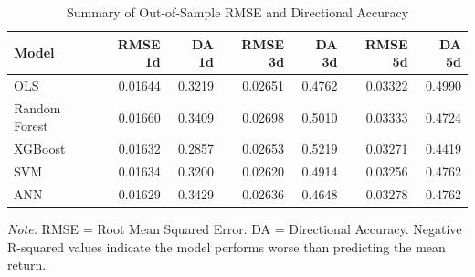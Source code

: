 \begin{table}[!ht]
\centering
\begin{threeparttable}
\caption{Summary of Out-of-Sample RMSE and Directional Accuracy}
\label{tab:main_results}

\begin{tabular}{lrrrrrr}
\toprule
Model & RMSE 1d & DA 1d & RMSE 3d & DA 3d & RMSE 5d & DA 5d\\
\midrule
OLS & 0.01644 & 0.3219 & 0.02651 & 0.4762 & 0.03322 & 0.4990\\
Random Forest & 0.01660 & 0.3409 & 0.02698 & 0.5010 & 0.03333 & 0.4724\\
XGBoost & 0.01632 & 0.2857 & 0.02653 & 0.5219 & 0.03271 & 0.4419\\
SVM & 0.01634 & 0.3200 & 0.02620 & 0.4914 & 0.03256 & 0.4762\\
ANN & 0.01629 & 0.3429 & 0.02636 & 0.4648 & 0.03278 & 0.4762\\
\bottomrule
\end{tabular}
\begin{tablenotes}
\footnotesize
\item \textit{Note.} RMSE = Root Mean Squared Error. DA = Directional Accuracy. Negative R-squared values indicate the model performs worse than predicting the mean return.
\end{tablenotes}
\end{threeparttable}
\end{table}
